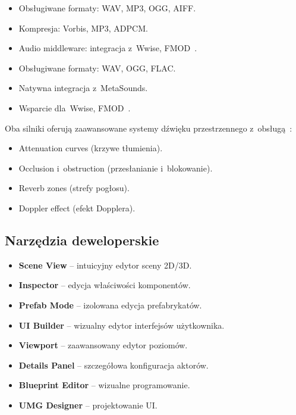 \begin{itemize}
    \item Obsługiwane formaty: WAV, MP3, OGG, AIFF.
    \item Kompresja: Vorbis, MP3, ADPCM.
    \item Audio middleware: integracja z~Wwise, FMOD~\cite{firat2022sound}.
\end{itemize}

\begin{itemize}
    \item Obsługiwane formaty: WAV, OGG, FLAC.
    \item Natywna integracja z~MetaSounds.
    \item Wsparcie dla~Wwise, FMOD~\cite{firat2022sound}.
\end{itemize}


Oba silniki oferują zaawansowane systemy dźwięku przestrzennego z~obsługą~\cite{firat2022sound}:
\begin{itemize}
    \item Attenuation curves (krzywe tłumienia).
    \item Occlusion i~obstruction (przesłanianie i~blokowanie).
    \item Reverb zones (strefy pogłosu).
    \item Doppler effect (efekt Dopplera).
\end{itemize}

\subsection{Narzędzia deweloperskie}


\begin{itemize}
    \item \textbf{Scene View} -- intuicyjny edytor sceny 2D/3D.
    \item \textbf{Inspector} -- edycja właściwości komponentów.
    \item \textbf{Prefab Mode} -- izolowana edycja prefabrykatów.
    \item \textbf{UI Builder} -- wizualny edytor interfejsów użytkownika.
\end{itemize}

\begin{itemize}
    \item \textbf{Viewport} -- zaawansowany edytor poziomów.
    \item \textbf{Details Panel} -- szczegółowa konfiguracja aktorów.
    \item \textbf{Blueprint Editor} -- wizualne programowanie.
    \item \textbf{UMG Designer} -- projektowanie UI.
\end{itemize}


